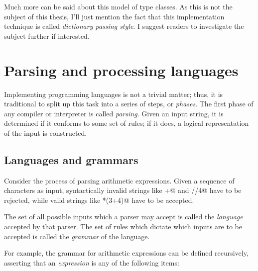 \documentclass[UdineBachThesis,american,11pt]{PhdThesis}
\begin{document}
  Much more can be said about this model of type classes. As this is not the
  subject of this thesis, I'll just mention the fact that this implementation
  technique is called \emph{dictionary passing style}. I suggest readers to
  investigate the subject further if interested.

  \chapter{Parsing and processing languages}

  Implementing programming languages is not a trivial matter; thus, it is
  traditional to split up this task into a series of steps, or \emph{phases}.
  The first phase of any compiler or interpreter is called \emph{parsing}. Given
  an input string, it is determined if it conforms to some set of rules; if it
  does, a logical representation of the input is constructed.

  \section{Languages and grammars}

  Consider the process of parsing arithmetic expressions. Given a sequence of
  characters as input, syntactically invalid strings like +@ and
  //4@ have to be rejected, while valid strings like
  *(3+4)@ have to be accepted.

  The set of all possible inputs which a parser may accept is called the
  \emph{language} accepted by that parser. The set of rules which dictate which
  inputs are to be accepted is called the \emph{grammar} of the language.

  For example, the grammar for arithmetic expressions can be defined
  recursively, asserting that an \emph{expression} is any of the following
  items:
\end{document}
